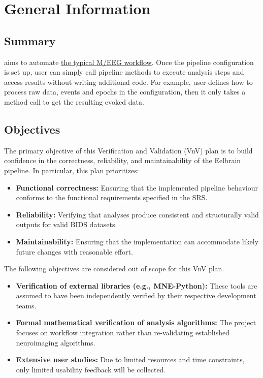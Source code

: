 \documentclass[12pt, titlepage]{article}
\begin{document}
\section{General Information}




\subsection{Summary}


\progname{} aims to automate \href{https://mne.tools/stable/documentation/cookbook.html}{the typical M/EEG workflow}. Once the pipeline configuration is set up, user can simply call pipeline methods to execute analysis steps and access results without writing additional code. For example, user defines how to process raw data, events and epochs in the configuration, then it only takes a method call to get the resulting evoked data.




\subsection{Objectives}


The primary objective of this Verification and Validation (VnV) plan is to build confidence in the correctness, reliability, and maintainability of the Eelbrain pipeline. In particular, this plan prioritizes:


\begin{itemize}
    \item \textbf{Functional correctness:} Ensuring that the implemented pipeline behaviour conforms to the functional requirements specified in the SRS.
    \item \textbf{Reliability:} Verifying that analyses produce consistent and structurally valid outputs for valid BIDS datasets.
    \item \textbf{Maintainability:} Ensuring that the implementation can accommodate likely future changes with reasonable effort.
\end{itemize}


\noindent The following objectives are considered out of scope for this VnV plan.


\begin{itemize}
    \item \textbf{Verification of external libraries (e.g., MNE-Python):} These tools are assumed to have been independently verified by their respective development teams.
    \item \textbf{Formal mathematical verification of analysis algorithms:} The project focuses on workflow integration rather than re-validating established neuroimaging algorithms.
    \item \textbf{Extensive user studies:} Due to limited resources and time constraints, only limited usability feedback will be collected.
\end{itemize}
\end{document}
